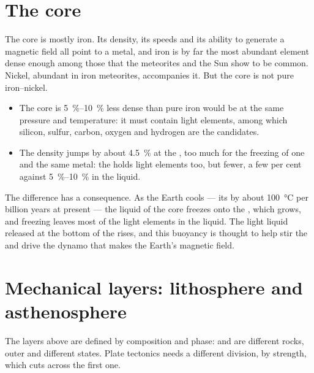 \section{The core}

The core is mostly iron. Its density, its speeds and its ability to generate a
magnetic field all point to a metal, and iron is by far the most abundant
element dense enough among those that the meteorites and the Sun show to be
common. Nickel, abundant in iron meteorites, accompanies it. But the core is
not pure iron--nickel.
\begin{itemize}
  \item The core is \qtyrange{5}{10}{\percent} less dense than pure iron would
        be at the same pressure and temperature: it must contain light
        elements, among which silicon, sulfur, carbon, oxygen and hydrogen are
        the candidates.
  \item The density jumps by about \qty{4.5}{\percent} at the , too much for the freezing of one and the same metal: the
         holds light elements too, but fewer, a few per cent
        against \qtyrange{5}{10}{\percent} in the liquid.
\end{itemize}
The difference has a consequence. As the Earth cools --- its  by about
\qty{100}{\degreeCelsius} per billion years at present --- the liquid of the core
freezes onto the , which grows, and
freezing leaves most of the light elements in the liquid. The light liquid
released at the bottom of the  rises, and this buoyancy is thought
to help stir the  and drive the dynamo that makes the Earth's
magnetic field.

\section{Mechanical layers: lithosphere and asthenosphere}

The layers above are defined by composition and phase:  and  are
different rocks, outer and  different states. Plate tectonics needs a
different division, by strength, which cuts across the first one.

